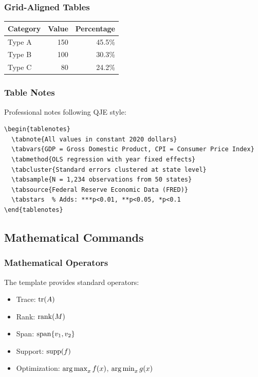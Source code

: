 \subsubsection{Grid-Aligned Tables}

\begin{gridtable}[h]
  \caption{Example of Grid-Aligned Table}
  \centering
  \begin{tabular}{@{}lrr@{}}
    \toprule
    Category & Value & Percentage \\
    \midrule
    Type A & 150 & 45.5\% \\
    Type B & 100 & 30.3\% \\
    Type C & 80 & 24.2\% \\
    \bottomrule
  \end{tabular}
\end{gridtable}

\subsubsection{Table Notes}

Professional notes following QJE style:

\begin{verbatim}
\begin{tablenotes}
  \tabnote{All values in constant 2020 dollars}
  \tabvars{GDP = Gross Domestic Product, CPI = Consumer Price Index}
  \tabmethod{OLS regression with year fixed effects}
  \tabcluster{Standard errors clustered at state level}
  \tabsample{N = 1,234 observations from 50 states}
  \tabsource{Federal Reserve Economic Data (FRED)}
  \tabstars  % Adds: ***p<0.01, **p<0.05, *p<0.1
\end{tablenotes}
\end{verbatim}

\subsection{Mathematical Commands}

\subsubsection{Mathematical Operators}

The template provides standard operators:

\begin{itemize}
\item Trace: $\operatorname{tr}(A)$
\item Rank: $\operatorname{rank}(M)$
\item Span: $\operatorname{span}\{v_1, v_2\}$
\item Support: $\operatorname{supp}(f)$
\item Optimization: $\operatorname*{arg\,max}_{x} f(x)$, $\operatorname*{arg\,min}_{x} g(x)$
\end{itemize}

